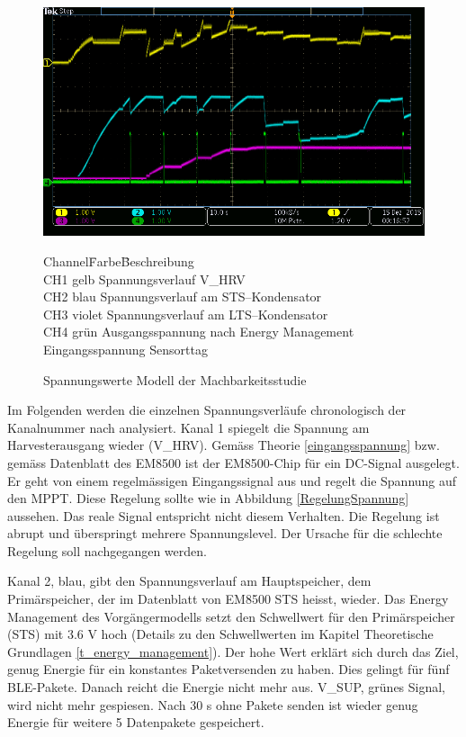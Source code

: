 \begin{figure}[ht]
    \includegraphics[width=1.0\textwidth]{3Vorgehen/imag/messungPA.png}
    \caption{Spannungswerte Modell der Machbarkeitsstudie}\label{spannungMachbarkeit} 
\begin{tabbing}
    Channel\quad\= Farbe\quad\= Beschreibung\\[0.8ex]
    CH1\> gelb\> Spannungsverlauf V\_HRV\\
    CH2\> blau\> Spannungsverlauf am STS--Kondensator\\
    CH3\> violet\> Spannungsverlauf am LTS--Kondensator\\
    CH4\> grün\> Ausgangsspannung nach Energy Management\\
     \>  \>      Eingangsspannung Sensorttag
\end{tabbing}    
\end{figure}

Im Folgenden werden die einzelnen Spannungsverläufe chronologisch der Kanalnummer nach analysiert. Kanal 1 spiegelt die Spannung am Harvesterausgang wieder (V\_HRV). Gemäss Theorie \ref{eingangsspannung} bzw. gemäss Datenblatt des EM8500 ist der EM8500-Chip für ein DC-Signal ausgelegt. Er geht von einem regelmässigen Eingangssignal aus und regelt die Spannung auf den MPPT. Diese Regelung sollte wie in Abbildung \ref{RegelungSpannung} aussehen. Das reale Signal entspricht nicht diesem Verhalten. Die Regelung ist abrupt und überspringt mehrere Spannungslevel. Der Ursache für die schlechte Regelung soll nachgegangen werden.

Kanal 2, blau, gibt den Spannungsverlauf am Hauptspeicher, dem Primärspeicher, der im Datenblatt von EM8500 STS heisst, wieder. Das Energy Management des Vorgängermodells setzt den Schwellwert für den Primärspeicher (STS) mit 3.6 V hoch (Details zu den Schwellwerten im Kapitel Theoretische Grundlagen \ref{t_energy_management}). Der hohe Wert erklärt sich durch das Ziel, genug Energie für ein konstantes Paketversenden zu haben. Dies gelingt für fünf BLE-Pakete. Danach reicht die Energie nicht mehr aus. V\_SUP, grünes Signal, wird nicht mehr gespiesen. Nach 30 s ohne Pakete senden ist wieder genug Energie für weitere 5 Datenpakete gespeichert.

